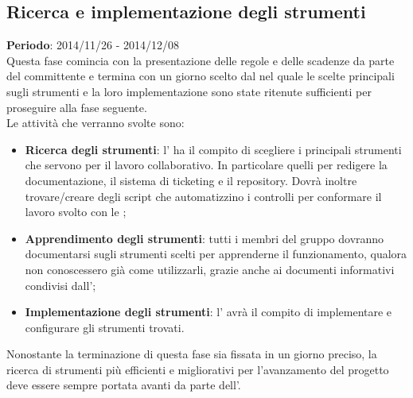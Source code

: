 	\subsection{Ricerca e implementazione degli strumenti} %
	\label{sub:ricerca_e_implementazione_degli_strumenti}
	\textbf{Periodo}: 2014/11/26 - 2014/12/08 \\
	Questa fase comincia con la presentazione delle regole e delle scadenze da parte del committente e termina con un giorno scelto dal \roleProjectManager{} nel quale le scelte principali sugli strumenti e la loro implementazione sono state ritenute sufficienti per proseguire alla fase seguente. \\
	Le attività che verranno svolte sono:
		\begin{itemize}
			\item \textbf{Ricerca degli strumenti}: l'\roleAdministrator{} ha il compito di scegliere i principali strumenti che servono per il lavoro collaborativo. In particolare quelli per redigere la documentazione, il sistema di ticketing e il repository. Dovrà inoltre trovare/creare degli script che automatizzino i controlli per conformare il lavoro svolto con le \docNameVersionNdP;
			\item \textbf{Apprendimento degli strumenti}: tutti i membri del gruppo dovranno documentarsi sugli strumenti scelti per apprenderne il funzionamento, qualora non conoscessero già come utilizzarli, grazie anche ai documenti informativi condivisi dall'\roleAdministrator;
			\item \textbf{Implementazione degli strumenti}: l'\roleAdministrator{} avrà il compito di implementare e configurare gli strumenti trovati.
		\end{itemize}
	\noindent
	Nonostante la terminazione di questa fase sia fissata in un giorno preciso, la ricerca di strumenti più efficienti e migliorativi per l'avanzamento del progetto deve essere sempre portata avanti da parte dell'\roleAdministrator.
	 	
